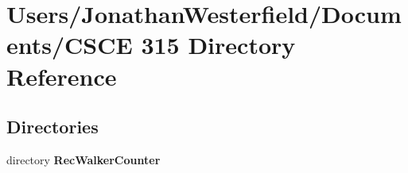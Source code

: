 \section{Users/\+Jonathan\+Westerfield/\+Documents/\+C\+S\+CE 315 Directory Reference}
\label{dir_f8572bb7c716aea4f4f1763625d4fe31}
\subsection*{Directories}
\begin{DoxyCompactItemize}
\item 
directory {\bf Rec\+Walker\+Counter}
\end{DoxyCompactItemize}
